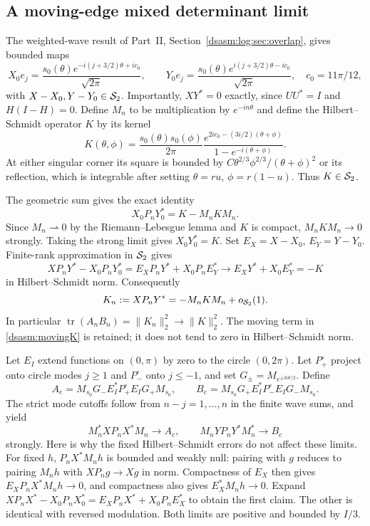 \documentclass[11pt,letterpaper]{article}
\theoremstyle{remark}\newtheorem{remark}[theorem]{Remark}
\DeclareMathOperator{\tr}{tr}\DeclareMathOperator{\Ran}{Ran}
\begin{document}
\subsection{A moving-edge mixed determinant limit}
The weighted-wave result of Part~II, Section~\ref{dsasm:log:sec:overlap}, gives bounded maps
\[
 X_0e_j=\frac{s_0(\theta)e^{-i(j+3/2)\theta+ic_0}}{\sqrt{2\pi}},
 \qquad Y_0e_j=\frac{s_0(\theta)e^{i(j+3/2)\theta-ic_0}}{\sqrt{2\pi}},
 \quad c_0=11\pi/12,
\]
with $X-X_0,Y-Y_0\in\mathcal S_2$. Importantly, $XY^*=0$ exactly,
since $UU^*=I$ and $H(I-H)=0$.
Define $M_n$ to be multiplication by $e^{-in\theta}$ and define the
Hilbert--Schmidt operator $K$ by its kernel
\begin{equation}\label{dsasm:Kedge}
 K(\theta,\phi)=\frac{s_0(\theta)s_0(\phi)}{2\pi}
 \frac{e^{2ic_0-(3i/2)(\theta+\phi)}}{1-e^{-i(\theta+\phi)}}.
\end{equation}
At either singular corner its square is bounded by
$C\theta^{2/3}\phi^{2/3}/(\theta+\phi)^2$ or its reflection,
which is integrable after setting $\theta=ru$, $\phi=r(1-u)$.
Thus $K\in\mathcal S_2$.

The geometric sum gives the exact identity
\[
 X_0P_nY_0^*=K-M_nKM_n.
\]
Since $M_n\rightharpoonup0$ by the Riemann--Lebesgue lemma and $K$
is compact, $M_nKM_n\to0$ strongly. Taking the strong limit gives
$X_0Y_0^*=K$. Set $E_X=X-X_0$, $E_Y=Y-Y_0$. Finite-rank approximation
in $\mathcal S_2$ gives
\[
 XP_nY^*-X_0P_nY_0^*=E_XP_nY^*+X_0P_nE_Y^*
       \longrightarrow E_XY^*+X_0E_Y^*=-K
\]
in Hilbert--Schmidt norm. Consequently
\begin{equation}\label{dsasm:movingK}
 K_n:=XP_nY^*=-M_nKM_n+o_{\mathcal S_2}(1).
\end{equation}
In particular $\tr(A_nB_n)=\|K_n\|_2^2\to\|K\|_2^2$.
The moving term in \eqref{dsasm:movingK} is retained; it does not tend to
zero in Hilbert--Schmidt norm.

Let $E_I$ extend functions on $(0,\pi)$ by zero to the circle
$(0,2\pi)$. Let $P_+^\circ$ project onto circle modes $j\ge1$ and
$P_-^\circ$ onto $j\le-1$, and set $G_\pm=M_{e^{\pm3i\theta/2}}$.
Define
\begin{equation}\label{dsasm:edgeAB}
 A_e=M_{s_0}G_-E_I^*P_+^\circ E_IG_+M_{s_0},\qquad
 B_e=M_{s_0}G_+E_I^*P_-^\circ E_IG_-M_{s_0}.
\end{equation}
The strict mode cutoffs follow from $n-j=1,\ldots,n$ in the finite
wave sums, and yield
\begin{equation}\label{dsasm:diagonallimits}
 M_n^*XP_nX^*M_n\longrightarrow A_e,\qquad
 M_nYP_nY^*M_n^*\longrightarrow B_e
\end{equation}
strongly. Here is why the fixed Hilbert--Schmidt errors do not affect
these limits. For fixed $h$, $P_nX^*M_nh$ is bounded and weakly null:
pairing with $g$ reduces to pairing $M_nh$ with $XP_ng\to Xg$ in
norm. Compactness of $E_X$ then gives
$E_XP_nX^*M_nh\to0$, and compactness also gives $E_X^*M_nh\to0$.
Expand $XP_nX^*-X_0P_nX_0^*=E_XP_nX^*+X_0P_nE_X^*$ to obtain
the first claim. The other is identical with reversed modulation.
Both limits are positive and bounded by $I/3$.
\end{document}
